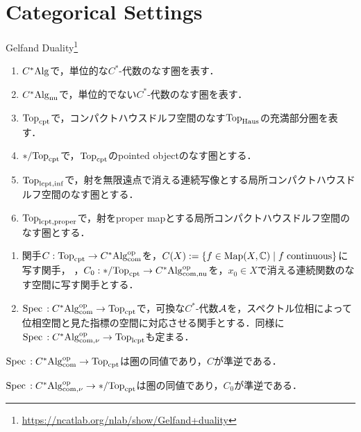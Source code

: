 \documentclass[uplatex,dvipdfmx]{jsreport}
\begin{document}
\section{Categorical Settings}

\begin{tcolorbox}[colframe=ForestGreen, colback=ForestGreen!10!white,breakable,colbacktitle=ForestGreen!40!white,coltitle=black,fonttitle=\bfseries\sffamily,
title=]
    Gelfand Duality\footnote{\url{https://ncatlab.org/nlab/show/Gelfand+duality}}
\end{tcolorbox}

\begin{notation}\mbox{}
    \begin{enumerate}
        \item $C^*\mathrm{Alg}$で，単位的な$C^*$-代数のなす圏を表す．
        \item $C^*\mathrm{Alg}_{\mathrm{nu}}$で，単位的でない$C^*$-代数のなす圏を表す．
        \item $\mathrm{Top}_{\mathrm{cpt}}$で，コンパクトハウスドルフ空間のなす$\mathrm{Top}_{\mathrm{Haus}}$の充満部分圏を表す．
        \item $*/\mathrm{Top}_{\mathrm{cpt}}$で，$\mathrm{Top}_{\mathrm{cpt}}$のpointed objectのなす圏とする．
        \item $\mathrm{Top}_{\mathrm{lcpt},\mathrm{inf}}$で，射を無限遠点で消える連続写像とする局所コンパクトハウスドルフ空間のなす圏とする．
        \item $\mathrm{Top}_{\mathrm{lcpt},\mathrm{proper}}$で，射をproper mapとする局所コンパクトハウスドルフ空間のなす圏とする．
    \end{enumerate}
\end{notation}

\begin{notation}[functors]\mbox{}
    \begin{enumerate}
        \item 関手$C:\mathrm{Top}_{\mathrm{cpt}}\to C^*\mathrm{Alg}^{\mathrm{op}}_{\mathrm{com}}$を，$C(X):=\left\{f\in\mathrm{Map}(X,\mathbb{C})\mid f\text{\;continuous}\right\}$に写す関手，
        ，$C_0:*/\mathrm{Top}_{\mathrm{cpt}}\to C^*\mathrm{Alg}^{\mathrm{op}}_{\mathrm{com},\mathrm{nu}}$を，$x_0\in X$で消える連続関数のなす空間に写す関手とする．
        \item $\mathrm{Spec}\,:C^*\mathrm{Alg}^{\mathrm{op}}_{\mathrm{com}}\to\mathrm{Top}_{\mathrm{cpt}}$で，可換な$C^*$-代数$\mathcal{A}$を，スペクトル位相によって位相空間と見た指標の空間に対応させる関手とする．同様に$\mathrm{Spec}\,:C^*\mathrm{Alg}^{\mathrm{op}}_{\mathrm{com},\nu}\to\mathrm{Top}_{\mathrm{lcpt}}$も定まる．
    \end{enumerate}
\end{notation}

\begin{theorem}
    $\mathrm{Spec}\,:C^*\mathrm{Alg}^{\mathrm{op}}_{\mathrm{com}}\to\mathrm{Top}_{\mathrm{cpt}}$は圏の同値であり，$C$が準逆である．
\end{theorem}
\begin{corollary}
    $\mathrm{Spec}\,:C^*\mathrm{Alg}^{\mathrm{op}}_{\mathrm{com},\nu}\to */\mathrm{Top}_{\mathrm{cpt}}$は圏の同値であり，$C_0$が準逆である．
\end{corollary}
\end{document}
